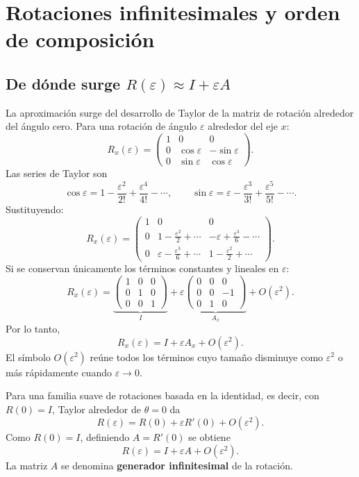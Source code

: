 \section{Rotaciones infinitesimales y orden de composición}\label{cap:infinitesimales}\label{ap:infinitesimales}

\subsection{De dónde surge \(R(\varepsilon)\approx I+\varepsilon A\)}

La aproximación surge del desarrollo de Taylor de la matriz de rotación alrededor del ángulo
cero. Para una rotación de ángulo \(\varepsilon\) alrededor del eje \(x\):
\[
R_x(\varepsilon)=
\begin{pmatrix}
1&0&0\\
0&\cos\varepsilon&-\sin\varepsilon\\
0&\sin\varepsilon& \cos\varepsilon
\end{pmatrix}.
\]
Las series de Taylor son
\[
\cos\varepsilon
=1-\frac{\varepsilon^2}{2!}+\frac{\varepsilon^4}{4!}-\cdots,
\qquad
\sin\varepsilon
=\varepsilon-\frac{\varepsilon^3}{3!}+\frac{\varepsilon^5}{5!}-\cdots.
\]
Sustituyendo:
\[
R_x(\varepsilon)=
\begin{pmatrix}
1&0&0\\
0&1-\frac{\varepsilon^2}{2}+\cdots&
-\varepsilon+\frac{\varepsilon^3}{6}-\cdots\\
0&\varepsilon-\frac{\varepsilon^3}{6}+\cdots&
1-\frac{\varepsilon^2}{2}+\cdots
\end{pmatrix}.
\]
Si se conservan únicamente los términos constantes y lineales en \(\varepsilon\):
\[
R_x(\varepsilon)
=
\underbrace{
\begin{pmatrix}
1&0&0\\0&1&0\\0&0&1
\end{pmatrix}}_{I}
+
\varepsilon
\underbrace{
\begin{pmatrix}
0&0&0\\0&0&-1\\0&1&0
\end{pmatrix}}_{A_x}
+O(\varepsilon^2).
\]
Por lo tanto,
\[
\boxed{R_x(\varepsilon)=I+\varepsilon A_x+O(\varepsilon^2)}.
\]
El símbolo \(O(\varepsilon^2)\) reúne todos los términos cuyo tamaño disminuye como
\(\varepsilon^2\) o más rápidamente cuando \(\varepsilon\to0\).

\begin{resultado}
Para una familia suave de rotaciones basada en la identidad, es decir, con \(R(0)=I\), Taylor
alrededor de \(\theta=0\) da
\[
R(\varepsilon)=R(0)+\varepsilon R'(0)+O(\varepsilon^2).
\]
Como \(R(0)=I\), definiendo \(A=R'(0)\) se obtiene
\[
\boxed{R(\varepsilon)=I+\varepsilon A+O(\varepsilon^2)}.
\]
La matriz \(A\) se denomina \textbf{generador infinitesimal} de la rotación.
\end{resultado}

